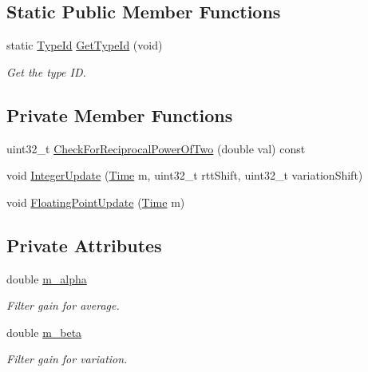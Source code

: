 \subsection*{Static Public Member Functions}
\begin{DoxyCompactItemize}
\item 
static \hyperlink{classns3_1_1TypeId}{Type\+Id} \hyperlink{classns3_1_1RttMeanDeviation_a23fc3e702e6d7290bf5fcd53d36e0aa2}{Get\+Type\+Id} (void)
\begin{DoxyCompactList}\small\item\em Get the type ID. \end{DoxyCompactList}\end{DoxyCompactItemize}
\subsection*{Private Member Functions}
\begin{DoxyCompactItemize}
\item 
uint32\+\_\+t \hyperlink{classns3_1_1RttMeanDeviation_a5b8a85f3cdb9d8c9cb438e7f2027bd8f}{Check\+For\+Reciprocal\+Power\+Of\+Two} (double val) const 
\item 
void \hyperlink{classns3_1_1RttMeanDeviation_af64f76fb0e39c735425f56add7e6bdd0}{Integer\+Update} (\hyperlink{classns3_1_1Time}{Time} m, uint32\+\_\+t rtt\+Shift, uint32\+\_\+t variation\+Shift)
\item 
void \hyperlink{classns3_1_1RttMeanDeviation_a6d3dc77a91e8c9aa23d912f2574111db}{Floating\+Point\+Update} (\hyperlink{classns3_1_1Time}{Time} m)
\end{DoxyCompactItemize}
\subsection*{Private Attributes}
\begin{DoxyCompactItemize}
\item 
double \hyperlink{classns3_1_1RttMeanDeviation_abc5474d0966c77bd5ae5631e60c885dd}{m\+\_\+alpha}
\begin{DoxyCompactList}\small\item\em Filter gain for average. \end{DoxyCompactList}\item 
double \hyperlink{classns3_1_1RttMeanDeviation_a38c17beed105df7cadd05207774f2147}{m\+\_\+beta}
\begin{DoxyCompactList}\small\item\em Filter gain for variation. \end{DoxyCompactList}\end{DoxyCompactItemize}
